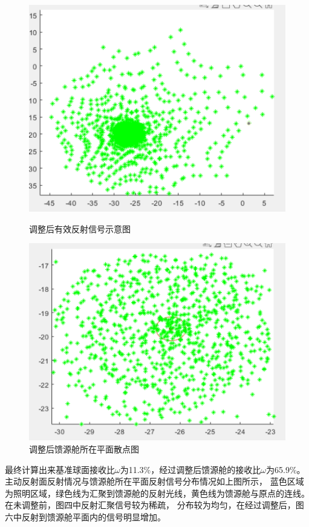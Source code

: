 \documentclass[withoutpreface,bwprint]{cumcmthesis} %
\begin{document}
\begin{figure}[H]
    \begin{minipage}[t]{0.5\linewidth}
    \centering
    \includegraphics[scale=0.3]{images/jieguo2.png}
    \caption{调整后有效反射信号示意图}
    \label{fig:side:c}
    \end{minipage}%
    \begin{minipage}[t]{0.5\linewidth}
    \centering
    \includegraphics[scale=0.3]{images/jieguo3.png}
    \caption{调整后馈源舱所在平面散点图}
    \label{fig:side:d}
    \end{minipage}
\end{figure}

最终计算出来基准球面接收比$\omega$为11.3\%，经过调整后馈源舱的接收比$\omega$为65.9\%。主动反射面反射情况与馈源舱所在平面反射信号分布情况如上图所示，
蓝色区域为照明区域，绿色线为汇聚到馈源舱的反射光线，黄色线为馈源舱与原点的连线。在未调整前，图四中反射汇聚信号较为稀疏，
分布较为均匀，在经过调整后，图六中反射到馈源舱平面内的信号明显增加。
\end{document}
